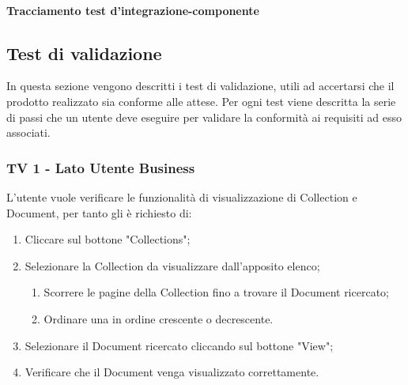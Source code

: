 \vspace{5cm}

\paragraph{Tracciamento test d'integrazione-componente}


\subsection{Test di validazione}
In questa sezione vengono descritti i test di validazione, utili ad accertarsi che il prodotto realizzato sia conforme alle attese.
Per ogni test viene descritta la serie di passi che un utente deve eseguire per validare la conformità ai requisiti ad esso associati.

\subsubsection{TV 1 - Lato Utente Business}

L'utente vuole verificare le funzionalità di visualizzazione di Collection e Document, per tanto gli è richiesto di:


\begin{enumerate}
\item Cliccare sul bottone "Collections";
\item Selezionare la Collection da visualizzare dall'apposito elenco;
\begin{enumerate}
\item Scorrere le pagine della Collection fino a trovare il Document ricercato;
\item Ordinare una  in ordine crescente o decrescente.
\end{enumerate}
\item Selezionare il Document ricercato cliccando sul bottone "View";
\item Verificare che il Document venga visualizzato correttamente.
\end{enumerate}

